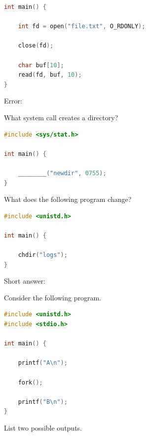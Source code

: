 \begin{questions}
\begin{lstlisting}[language=C]
int main() {

    int fd = open("file.txt", O_RDONLY);

    close(fd);

    char buf[10];
    read(fd, buf, 10);
}
\end{lstlisting}

	Error:

	\vspace{1cm}

	\question[6]

	What system call creates a directory?

	\begin{lstlisting}[language=C]
#include <sys/stat.h>

int main() {

    ________("newdir", 0755);
}
\end{lstlisting}

	\vspace{1cm}

	\question[6]

	What does the following program change?

	\begin{lstlisting}[language=C]
#include <unistd.h>

int main() {

    chdir("logs");
}
\end{lstlisting}

	Short answer:

	\vspace{2cm}

	\question[10]

	Consider the following program.

	\begin{lstlisting}[language=C]
#include <unistd.h>
#include <stdio.h>

int main() {

    printf("A\n");

    fork();

    printf("B\n");
}
\end{lstlisting}

	List two possible outputs.

	\vspace{3cm}

	\question[10]


\end{questions}
